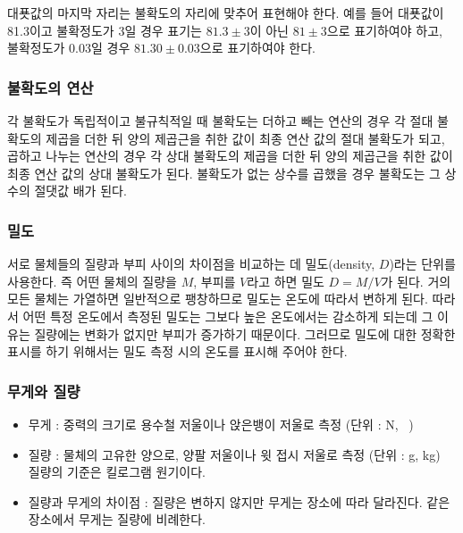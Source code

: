 \documentclass{GSHS-chemexp}
\begin{document}
	대푯값의 마지막 자리는 불확도의 자리에 맞추어 표현해야 한다.
	예를 들어 대푯값이 81.3이고 불확정도가 3일 경우 표기는 $81.3\pm 3$이 아닌
	$81\pm3$으로 표기하여야 하고, 불확정도가 0.03일 경우 $81.30\pm 0.03$으로
	표기하여야 한다.
	\cite{Taylor_John2}
	
	\subsubsection{불확도의 연산}
	각 불확도가 독립적이고 불규칙적일 때 불확도는
	더하고 빼는 연산의 경우 각 절대 불확도의 제곱을 더한 뒤
	양의 제곱근을 취한 값이 최종 연산 값의 절대 불확도가 되고,
	곱하고 나누는 연산의 경우 각 상대 불확도의 제곱을 더한 뒤
	양의 제곱근을 취한 값이 최종 연산 값의 상대 불확도가 된다.
	불확도가 없는 상수를 곱했을 경우 불확도는 그 상수의 절댓값 배가 된다.
	\cite{Penn}
	
	\subsubsection{밀도}
		서로 물체들의 질량과 부피 사이의 차이점을 비교하는 데
		밀도(density, $D$)라는 단위를 사용한다.
		즉 어떤 물체의 질량을 $M$, 부피를 $V$라고 하면 밀도 $D=M/V$가 된다.
		거의 모든 물체는 가열하면 일반적으로 팽창하므로
		밀도는 온도에 따라서 변하게 된다.
		따라서 어떤 특정 온도에서 측정된 밀도는
		그보다 높은 온도에서는 감소하게 되는데
		그 이유는 질량에는 변화가 없지만 부피가 증가하기 때문이다.
		그러므로 밀도에 대한 정확한 표시를 하기 위해서는
		밀도 측정 시의 온도를 표시해 주어야 한다.
		
	\subsubsection{무게와 질량}
		\begin{itemize}
			\item 무게 : 중력의 크기로 용수철 저울이나 앉은뱅이 저울로 측정
			(단위 : \si{\newton}, \si{\kilo\gramforce})
			\item 질량 : 물체의 고유한 양으로, 양팔 저울이나 윗 접시 저울로
			측정 (단위 : \si{\gram}, \si{\kilo\gram})\\
			질량의 기준은 킬로그램 원기이다.
			\item 질량과 무게의 차이점 : 질량은 변하지 않지만
			무게는 장소에 따라 달라진다.
			같은 장소에서 무게는 질량에 비례한다. 
		\end{itemize}
	
\end{document}
